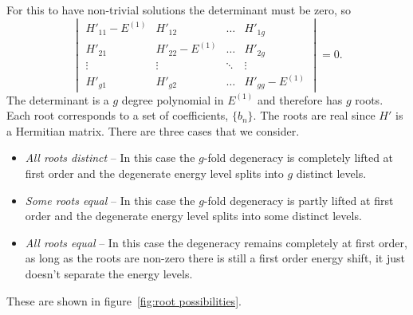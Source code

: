     For this to have non-trivial solutions the determinant must be zero, so
    \[
        \begin{vmatrix}
            H'_{11} - E^{(1)} & H'_{12} & \dots & H'_{1g}\\
            H'_{21} & H'_{22} - E^{(1)} & \dots & H'_{2g}\\
            \vdots & \vdots & \ddots & \vdots\\
            H'_{g1} & H'_{g2} & \dots & H'_{gg} - E^{(1)}
        \end{vmatrix}
        = 0.
    \]
    The determinant is a \(g\) degree polynomial in \(E^{(1)}\) and therefore has \(g\) roots.
    Each root corresponds to a set of coefficients, \(\{b_n\}\).
    The roots are real since \(H'\) is a Hermitian matrix.
    There are three cases that we consider.
    \begin{itemize}
        \item \textit{All roots distinct} -- In this case the \(g\)-fold degeneracy is completely lifted at first order and the degenerate energy level splits into \(g\) distinct levels.
        \item \textit{Some roots equal} -- In this case the \(g\)-fold degeneracy is partly lifted at first order and the degenerate energy level splits into some distinct levels.
        \item \textit{All roots equal} -- In this case the degeneracy remains completely at first order, as long as the roots are non-zero there is still a first order energy shift, it just doesn't separate the energy levels.
    \end{itemize}
    These are shown in figure~\ref{fig:root possibilities}.
